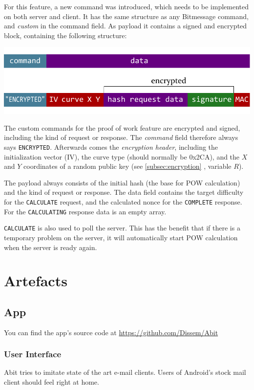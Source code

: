 \documentclass{bfh}
\begin{document}
  For this feature, a new command was introduced, which needs to be implemented on both server and client. It has the same structure as any Bitmessage command, and \textit{custom} in the command field. As payload it contains a signed and encrypted block, containing the following structure:

  \includegraphics[width=\textwidth]{images/custom_message.pdf}

  The custom commands for the proof of work feature are encrypted and signed, including the kind of request or response. The \textit{command} field therefore always says \texttt{ENCRYPTED}. Afterwards comes the \textit{encryption header}, including the initialization vector (IV), the curve type (should normally be 0x2CA), and the $X$ and $Y$ coordinates of a random public key (see \ref{subsec:encryption} , variable $R$).

  The payload always consists of the initial hash (the base for \ac{POW} calculation) and the kind of request or response. The data field contains the target difficulty for the \texttt{CALCULATE} request, and the calculated nonce for the \texttt{COMPLETE} response. For the \texttt{CALCULATING} response data is an empty array.

  \texttt{CALCULATE} is also used to poll the server. This has the benefit that if there is a temporary problem on the server, it will automatically start \ac{POW} calculation when the server is ready again.


  \newpage
  \section{Artefacts}

  \subsection{App}
  You can find the app's source code at \url{https://github.com/Dissem/Abit}

  \subsubsection{User Interface}
  Abit tries to imitate state of the art e-mail clients. Users of Android's stock mail client should feel right at home.
\end{document}
